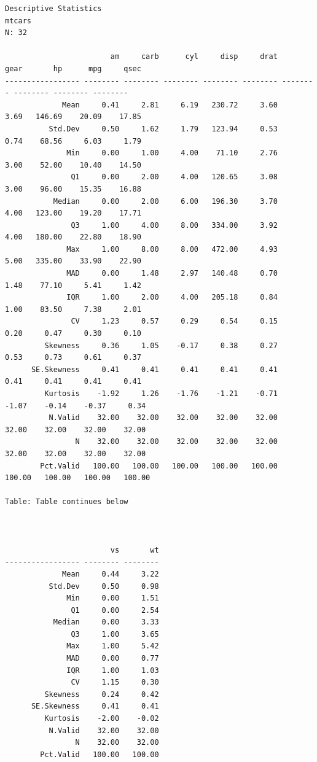 \documentclass[
  letterpaper,
  DIV=11,
  numbers=noendperiod]{scrartcl}
\begin{document}
\begin{verbatim}
Descriptive Statistics  
mtcars  
N: 32  

                        am     carb      cyl     disp     drat     gear       hp      mpg     qsec
----------------- -------- -------- -------- -------- -------- -------- -------- -------- --------
             Mean     0.41     2.81     6.19   230.72     3.60     3.69   146.69    20.09    17.85
          Std.Dev     0.50     1.62     1.79   123.94     0.53     0.74    68.56     6.03     1.79
              Min     0.00     1.00     4.00    71.10     2.76     3.00    52.00    10.40    14.50
               Q1     0.00     2.00     4.00   120.65     3.08     3.00    96.00    15.35    16.88
           Median     0.00     2.00     6.00   196.30     3.70     4.00   123.00    19.20    17.71
               Q3     1.00     4.00     8.00   334.00     3.92     4.00   180.00    22.80    18.90
              Max     1.00     8.00     8.00   472.00     4.93     5.00   335.00    33.90    22.90
              MAD     0.00     1.48     2.97   140.48     0.70     1.48    77.10     5.41     1.42
              IQR     1.00     2.00     4.00   205.18     0.84     1.00    83.50     7.38     2.01
               CV     1.23     0.57     0.29     0.54     0.15     0.20     0.47     0.30     0.10
         Skewness     0.36     1.05    -0.17     0.38     0.27     0.53     0.73     0.61     0.37
      SE.Skewness     0.41     0.41     0.41     0.41     0.41     0.41     0.41     0.41     0.41
         Kurtosis    -1.92     1.26    -1.76    -1.21    -0.71    -1.07    -0.14    -0.37     0.34
          N.Valid    32.00    32.00    32.00    32.00    32.00    32.00    32.00    32.00    32.00
                N    32.00    32.00    32.00    32.00    32.00    32.00    32.00    32.00    32.00
        Pct.Valid   100.00   100.00   100.00   100.00   100.00   100.00   100.00   100.00   100.00

Table: Table continues below

 

                        vs       wt
----------------- -------- --------
             Mean     0.44     3.22
          Std.Dev     0.50     0.98
              Min     0.00     1.51
               Q1     0.00     2.54
           Median     0.00     3.33
               Q3     1.00     3.65
              Max     1.00     5.42
              MAD     0.00     0.77
              IQR     1.00     1.03
               CV     1.15     0.30
         Skewness     0.24     0.42
      SE.Skewness     0.41     0.41
         Kurtosis    -2.00    -0.02
          N.Valid    32.00    32.00
                N    32.00    32.00
        Pct.Valid   100.00   100.00
\end{verbatim}
\end{document}
